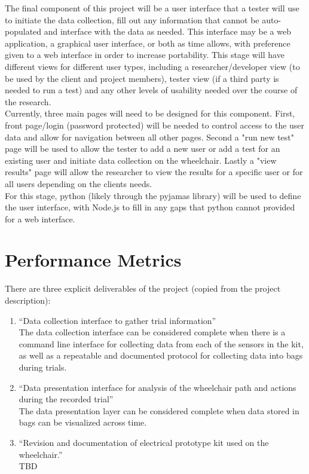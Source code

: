 \documentclass[onecolumn, draftclsnofoot,10pt, compsoc]{IEEEtran}
\begin{document}
\begin{enumerate}
	The final component of this project will be a user interface that a tester will use to initiate the data collection, fill out any information that cannot be auto-populated and interface with the data as needed. This interface may be a web application, a graphical user interface, or both as time allows, with preference given to a web interface in order to increase portability. This stage will have different views for different user types, including a researcher/developer view (to be used by the client and project members), tester view (if a third party is needed to run a test) and any other levels of usability needed over the course of the research.\\
	Currently, three main pages will need to be designed for this component. First, front page/login (password protected) will be needed to control access to the user data and allow for navigation between all other pages. Second a "run new test" page will be used to allow the tester to add a new user or add a test for an existing user and initiate data collection on the wheelchair. Lastly a "view results" page will allow the researcher to view the results for a specific user or for all users depending on the clients needs. \\
	For this stage, python (likely through the pyjamas library) will be used to define the user interface, with Node.js to fill in any gaps that python cannot provided for a web interface.\\
	

\end{enumerate}



\section{Performance Metrics}
	There are three explicit deliverables of the project (copied from the project description): 
\begin{enumerate}
	\item \large{“Data collection interface to gather trial information”}
	\\
	\normalsize The data collection interface can be considered complete when there is a command line interface for collecting data from each of the sensors in the kit, as well as a repeatable and documented protocol for collecting data into bags during trials. 
	\\
	\item \large {“Data presentation interface for analysis of the wheelchair path and actions during the recorded trial”}
	\\
	\normalsize The data presentation layer can be considered complete when data stored in bags can be visualized across time.\\
	\item \large{“Revision and documentation of electrical prototype kit used on the wheelchair.”}
	\\
	\normalsize TBD
\end{enumerate}
\end{document}
